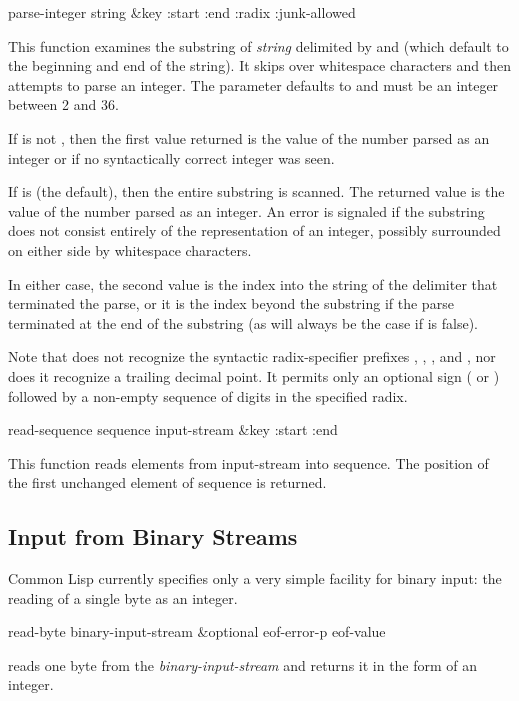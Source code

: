 \begin{defun}[Function]
parse-integer string &key :start :end :radix :junk-allowed

This function examines the substring of \emph{string} delimited by 
and  (which default to the beginning and end of the string).
It skips over whitespace characters and then attempts to
parse an integer.  The  parameter defaults to 
and must be an integer between 2 and 36.

If  is not {\false}, then the first value
returned is the value of the number parsed
as an integer or {\false} if no syntactically correct integer
was seen.

If  is {\false} (the default), then the entire substring is scanned.
The returned value is the value of the number parsed as an integer.
An error is signaled if the substring does not consist entirely of
the representation of an integer, possibly surrounded on either side by
whitespace characters.

In either case, the second value is the index into the string of the delimiter
that terminated the parse, or it is the index beyond the substring if the
parse terminated at the end of the substring (as will always be the case if
 is false).

Note that  does not recognize the syntactic radix-specifier
prefixes , , , and , nor does it recognize
a trailing decimal point.  It permits only an optional sign
(\cdf{+} or \cdf{-}) followed
by a non-empty sequence of digits in the specified radix.
\end{defun}

\begin{defun}[Function]
read-sequence sequence input-stream &key :start :end

This function reads elements from input-stream into sequence. The position of
the first unchanged element of sequence is returned.
\end{defun}

\subsection {Input from Binary Streams}

Common Lisp currently specifies only a very simple facility for binary input:
the reading of a single byte as an integer.

\begin{defun}[Function]
read-byte binary-input-stream &optional eof-error-p eof-value

 reads one byte from the \emph{binary-input-stream} and returns
it in the form of an integer.
\end{defun}

